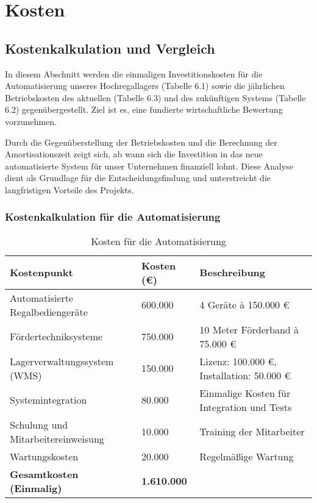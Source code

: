\chapter{Kosten}
\section*{Kostenkalkulation und Vergleich}
In diesem Abschnitt werden die einmaligen Investitionskosten für die Automatisierung unseres Hochregallagers (Tabelle 6.1) sowie die jährlichen Betriebskosten des aktuellen (Tabelle 6.3) und des zukünftigen Systems (Tabelle 6.2) gegenübergestellt. Ziel ist es, eine fundierte wirtschaftliche Bewertung vorzunehmen.  

Durch die Gegenüberstellung der Betriebskosten und die Berechnung der Amortisationszeit zeigt sich, ab wann sich die Investition in das neue automatisierte System für unser Unternehmen finanziell lohnt. Diese Analyse dient als Grundlage für die Entscheidungsfindung und unterstreicht die langfristigen Vorteile des Projekts.  
\subsection*{Kostenkalkulation für die Automatisierung}

\begin{table}[h!]
	\centering
	\begin{tabular}{|p{8cm}|p{4cm}|p{5cm}|}
		\hline
		\textbf{Kostenpunkt} & \textbf{Kosten (€)} & \textbf{Beschreibung} \\
		\hline
		Automatisierte Regalbediengeräte & 600.000 & 4 Geräte à 150.000 € \\
		\hline
		Fördertechniksysteme & 750.000 & 10 Meter Förderband à 75.000 € \\
		\hline
		Lagerverwaltungssystem (WMS) & 150.000 & Lizenz: 100.000 €, Installation: 50.000 € \\
		\hline
		Systemintegration & 80.000 & Einmalige Kosten für Integration und Tests \\
		\hline
		Schulung und Mitarbeitereinweisung & 10.000 & Training der Mitarbeiter \\
		\hline
		Wartungskosten & 20.000 & Regelmäßige Wartung \\
		\hline
		\textbf{Gesamtkosten (Einmalig)} & \textbf{1.610.000} & \\
		\hline
	\end{tabular}
	\caption{Kosten für die Automatisierung}
\end{table}


